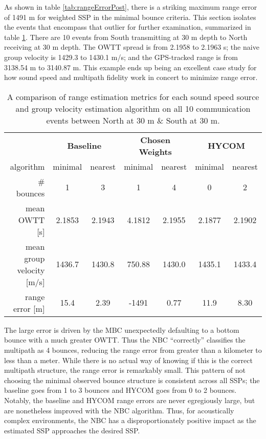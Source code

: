 As shown in table \ref{tab:rangeErrorPost}, there is a striking maximum range error of 1491 m for weighted SSP in the minimal bounce criteria.
This section isolates the events that encompass that outlier for further examination, summarized in table \ref{tab:rangeErrorPostExplanation}.
There are 10 events from South transmitting at 30 m depth to North receiving at 30 m depth.
The OWTT spread is from 2.1958 to 2.1963 s; the naive group velocity is 1429.3 to 1430.1 m/s; and the GPS-tracked range is from 3138.54 m to 3140.87 m.
This example ends up being an excellent case study for how sound speed and multipath fidelity work in concert to minimize range error.

\begin{table}[h!]
\renewcommand{\arraystretch}{1.5}
\centering
\begin{tabular}{r|cc|cc|cc}\toprule
 & \multicolumn{2}{c|}{\textbf{Baseline} } & \multicolumn{2}{c|}{\textbf{Chosen Weights} } & \multicolumn{2}{c}{\textbf{HYCOM}} \\
 algorithm & \cellcolor[HTML]{EFEFEF}minimal & nearest & \cellcolor[HTML]{EFEFEF} minimal& nearest & \cellcolor[HTML]{EFEFEF}minimal & nearest \\ \hline
 \# bounces 				& \cellcolor[HTML]{EFEFEF}1 		& 3 		& \cellcolor[HTML]{EFEFEF}1 		& 4 		& \cellcolor[HTML]{EFEFEF}0 	 & 2 \\
 mean OWTT [s] 				& \cellcolor[HTML]{EFEFEF}2.1853 	& 2.1943 	& \cellcolor[HTML]{EFEFEF}4.1812 	& 2.1955 	& \cellcolor[HTML]{EFEFEF}2.1877 & 2.1902 \\
 mean group velocity [m/s] 	& \cellcolor[HTML]{EFEFEF}1436.7 	& 1430.8 	& \cellcolor[HTML]{EFEFEF}750.88 	& 1430.0 	& \cellcolor[HTML]{EFEFEF}1435.1 & 1433.4 \\
 range error [m] 			& \cellcolor[HTML]{EFEFEF}15.4 		& 2.39 	 	& \cellcolor[HTML]{EFEFEF}-1491 	& 0.77 		& \cellcolor[HTML]{EFEFEF}11.9 & 8.30 \\
 \toprule
\end{tabular}
\caption[Further look at algorithm differences for one beacon to beacon pairing]{A comparison of range estimation metrics for each sound speed source and group velocity estimation algorithm on all 10 communication events between North at 30 m \& South at 30 m.}
\label{tab:rangeErrorPostExplanation}
\end{table}

The large error is driven by the MBC unexpectedly defaulting to a bottom bounce with a much greater OWTT.
Thus the NBC ``correctly'' classifies the multipath as 4 bounces, reducing the range error from greater than a kilometer to less than a meter.
While there is no actual way of knowing if this is the correct multipath structure, the range error is remarkably small.
This pattern of not choosing the minimal observed bounce structure is consistent across all SSPs; the baseline goes from 1 to 3 bounces and HYCOM goes from 0 to 2 bounces.
Notably, the baseline and HYCOM range errors are never egregiously large, but are nonetheless improved with the NBC algorithm.
Thus, for acoustically complex environments, the NBC has a disproportionately positive impact as the estimated SSP approaches the desired SSP.

